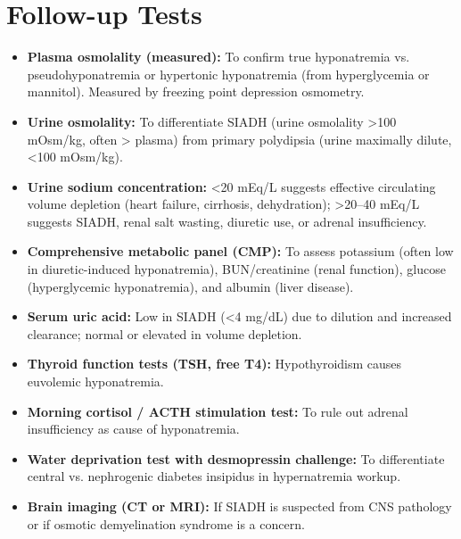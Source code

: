 \section*{Follow-up Tests}
\begin{itemize}
  \item \textbf{Plasma osmolality (measured):} To confirm true hyponatremia vs. pseudohyponatremia or hypertonic hyponatremia (from hyperglycemia or mannitol). Measured by freezing point depression osmometry.
  \item \textbf{Urine osmolality:} To differentiate SIADH (urine osmolality >100 mOsm/kg, often > plasma) from primary polydipsia (urine maximally dilute, <100 mOsm/kg).
  \item \textbf{Urine sodium concentration:} <20 mEq/L suggests effective circulating volume depletion (heart failure, cirrhosis, dehydration); >20--40 mEq/L suggests SIADH, renal salt wasting, diuretic use, or adrenal insufficiency.
  \item \textbf{Comprehensive metabolic panel (CMP):} To assess potassium (often low in diuretic-induced hyponatremia), BUN/creatinine (renal function), glucose (hyperglycemic hyponatremia), and albumin (liver disease).
  \item \textbf{Serum uric acid:} Low in SIADH (<4 mg/dL) due to dilution and increased clearance; normal or elevated in volume depletion.
  \item \textbf{Thyroid function tests (TSH, free T4):} Hypothyroidism causes euvolemic hyponatremia.
  \item \textbf{Morning cortisol / ACTH stimulation test:} To rule out adrenal insufficiency as cause of hyponatremia.
  \item \textbf{Water deprivation test with desmopressin challenge:} To differentiate central vs. nephrogenic diabetes insipidus in hypernatremia workup.
  \item \textbf{Brain imaging (CT or MRI):} If SIADH is suspected from CNS pathology or if osmotic demyelination syndrome is a concern.
\end{itemize}

